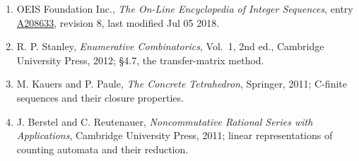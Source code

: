 \documentclass[11pt]{article}
\theoremstyle{definition}
\begin{document}
\begin{enumerate}

\item OEIS Foundation Inc., \emph{The On-Line Encyclopedia of Integer Sequences}, entry \href{https://oeis.org/A208633}{A208633}, revision 8, last modified Jul 05 2018.

\item R. P. Stanley, \emph{Enumerative Combinatorics}, Vol.~1, 2nd ed., Cambridge University Press, 2012; \S4.7, the transfer-matrix method.

\item M. Kauers and P. Paule, \emph{The Concrete Tetrahedron}, Springer, 2011; C-finite sequences and their closure properties.

\item J. Berstel and C. Reutenauer, \emph{Noncommutative Rational Series with Applications}, Cambridge University Press, 2011; linear representations of counting automata and their reduction.

\end{enumerate}
\end{document}
